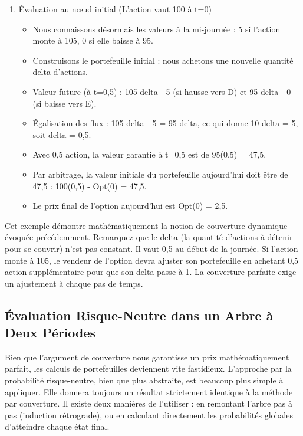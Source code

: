 \begin{examplebox}
\begin{enumerate}[label=Étape \arabic* :, leftmargin=*]
    \vspace{0.2cm}
    \item Évaluation au nœud initial (L'action vaut 100 à t=0)
    \begin{itemize}[label=$\cdot$]
        \item Nous connaissons désormais les valeurs à la mi-journée : 5 si l'action monte à 105, 0 si elle baisse à 95.
        \item Construisons le portefeuille initial : nous achetons une nouvelle quantité delta d'actions.
        \item Valeur future (à t=0,5) : 105 delta - 5 (si hausse vers D) et 95 delta - 0 (si baisse vers E).
        \item Égalisation des flux : 105 delta - 5 = 95 delta, ce qui donne 10 delta = 5, soit delta = 0,5.
        \item Avec 0,5 action, la valeur garantie à t=0,5 est de 95(0,5) = 47,5.
        \item Par arbitrage, la valeur initiale du portefeuille aujourd'hui doit être de 47,5 : 100(0,5) - Opt(0) = 47,5.
        \item Le prix final de l'option aujourd'hui est Opt(0) = 2,5.
    \end{itemize}

\end{enumerate}
\end{examplebox}

\begin{remarquebox}
Cet exemple démontre mathématiquement la notion de couverture dynamique évoquée précédemment. Remarquez que le delta (la quantité d'actions à détenir pour se couvrir) n'est pas constant. Il vaut 0,5 au début de la journée. Si l'action monte à 105, le vendeur de l'option devra ajuster son portefeuille en achetant 0,5 action supplémentaire pour que son delta passe à 1. La couverture parfaite exige un ajustement à chaque pas de temps.
\end{remarquebox}

\subsection{Évaluation Risque-Neutre dans un Arbre à Deux Périodes}

\begin{intuitionbox}
Bien que l'argument de couverture nous garantisse un prix mathématiquement parfait, les calculs de portefeuilles deviennent vite fastidieux. L'approche par la probabilité risque-neutre, bien que plus abstraite, est beaucoup plus simple à appliquer. Elle donnera toujours un résultat strictement identique à la méthode par couverture.
Il existe deux manières de l'utiliser : en remontant l'arbre pas à pas (induction rétrograde), ou en calculant directement les probabilités globales d'atteindre chaque état final.
\end{intuitionbox}

